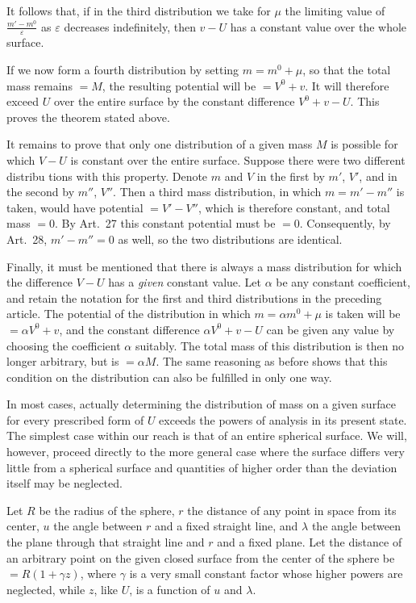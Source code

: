 It follows that, if in the third distribution we take for $\mu$ the limiting value of $\frac{m'-m^0}{\varepsilon}$ as $\varepsilon$ decreases indefinitely, then $v-U$ has a constant value over the whole surface.

If we now form a fourth distribution by setting $m=m^0+\mu$, so that the total mass remains $=M$, the resulting potential will be $=V^0+v$. It will therefore exceed $U$ over the entire surface by the constant difference $V^0+v-U$. This proves the theorem stated above.

It remains to prove that only one distribution of a given mass $M$ is possible for which $V-U$ is constant over the entire surface. Suppose there were two different distribu%
%
tions with this property. Denote $m$ and $V$ in the first by $m'$, $V'$, and in the second by $m''$, $V''$. Then a third mass distribution, in which $m=m'-m''$ is taken, would have potential $=V'-V''$, which is therefore constant, and total mass $=0$. By Art.\ 27 this constant potential must be $=0$. Consequently, by Art.\ 28, $m'-m''=0$ as well, so the two distributions are identical.

Finally, it must be mentioned that there is always a mass distribution for which the difference $V-U$ has a \textit{given} constant value. Let $\alpha$ be any constant coefficient, and retain the notation for the first and third distributions in the preceding article. The potential of the distribution in which $m=\alpha m^0+\mu$ is taken will be $=\alpha V^0+v$, and the constant difference $\alpha V^0+v-U$ can be given any value by choosing the coefficient $\alpha$ suitably. The total mass of this distribution is then no longer arbitrary, but is $=\alpha M$. The same reasoning as before shows that this condition on the distribution can also be fulfilled in only one way.

In most cases, actually determining the distribution of mass on a given surface for every prescribed form of $U$ exceeds the powers of analysis in its present state. The simplest case within our reach is that of an entire spherical surface. We will, however, proceed directly to the more general case where the surface differs very little from a spherical surface and quantities of higher order than the deviation itself may be neglected.

Let $R$ be the radius of the sphere, $r$ the distance of any point in space from its center, $u$ the angle between $r$ and a fixed straight line, and $\lambda$ the angle between the plane through that straight line and $r$ and a fixed plane. Let the distance of an arbitrary point on the given closed surface from the center of the sphere be $=R(1+\gamma z)$, where $\gamma$ is a very small constant factor whose higher powers are neglected, while $z$, like $U$, is a function of $u$ and $\lambda$.

